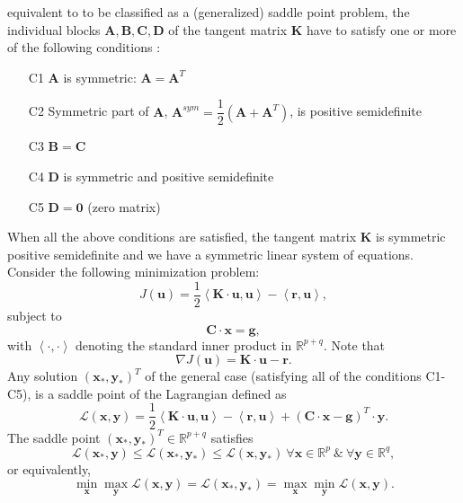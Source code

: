 \documentclass[11pt,a4paper,final]{article}
\begin{document}
equivalent to  to be classified as a (generalized) saddle point problem, the individual blocks $\mathbf{A}, \mathbf{B}, \mathbf{C}, \mathbf{D}$ of the tangent matrix $\mathbf{K}$ have to satisfy one or more of the following conditions \cite{Benzi2005}:
\begin{itemize}
\item[C1] $\mathbf{A}$ is symmetric: $\mathbf{A} = \mathbf{A}^T$
\item[C2] Symmetric part of $\mathbf{A}$, $\mathbf{A}^{sym} = \dfrac{1}{2} \left( \mathbf{A} + \mathbf{A}^T \right)$, is positive semidefinite
\item[C3] $\mathbf{B} = \mathbf{C}$
\item[C4] $\mathbf{D}$ is symmetric and positive semidefinite
\item[C5] $\mathbf{D} = \mathbf{0}$ (zero matrix)
\end{itemize}
When all the above conditions are satisfied, the tangent matrix $\mathbf{K}$ is symmetric positive semidefinite and we have a symmetric linear system of equations. Consider the following minimization problem:
\begin{equation}
J(\mathbf{u}) = \dfrac{1}{2} \left\langle \mathbf{K} \cdot \mathbf{u}, \mathbf{u} \right\rangle - \left\langle \mathbf{r}, \mathbf{u} \right\rangle,
\label{eq:3.12}
\end{equation}
subject to 
\begin{equation}
\mathbf{C} \cdot \mathbf{x} = \mathbf{g},
\label{eq:3.13}
\end{equation}
with $\left\langle \cdot, \cdot \right\rangle$ denoting the standard inner product in $\mathbb{R}^{p+q}$.
Note that
\begin{equation}
\nabla J(\mathbf{u}) = \mathbf{K} \cdot \mathbf{u} - \mathbf{r}.
\end{equation}
Any solution $(\mathbf{x}_{\ast}, \mathbf{y}_{\ast})^T$ of the general case (satisfying all of the conditions C1-C5), is a saddle point of the Lagrangian defined as
\begin{equation}
\mathcal{L}(\mathbf{x}, \mathbf{y}) = \dfrac{1}{2} \left\langle \mathbf{K} \cdot \mathbf{u}, \mathbf{u} \right\rangle - \left\langle \mathbf{r}, \mathbf{u} \right\rangle + (\mathbf{C} \cdot \mathbf{x} - \mathbf{g})^T \cdot \mathbf{y}.
\label{eq:3.14}
\end{equation}
The saddle point $(\mathbf{x}_{\ast}, \mathbf{y}_{\ast})^T \in \mathbb{R}^{p+q}$ satisfies
\begin{equation}
\mathcal{L}(\mathbf{x}_{\ast}, \mathbf{y}) \leq \mathcal{L}(\mathbf{x}_{\ast}, \mathbf{y}_{\ast}) \leq \mathcal{L}(\mathbf{x}, \mathbf{y}_{\ast}) \ \forall \mathbf{x} \in \mathbb{R}^p \ \& \ \forall \mathbf{y} \in \mathbb{R}^q, 
\label{eq:3.15.1}
\end{equation}
or equivalently, 
\begin{equation}
\min_{\mathbf{x}} \max_{\mathbf{y}} \mathcal{L}(\mathbf{x}, \mathbf{y}) = \mathcal{L}(\mathbf{x}_{\ast}, \mathbf{y}_{\ast}) = \max_{\mathbf{x}} \min_{\mathbf{y}} \mathcal{L}(\mathbf{x}, \mathbf{y}).
\label{eq:3.15.2}
\end{equation}
\end{document}
